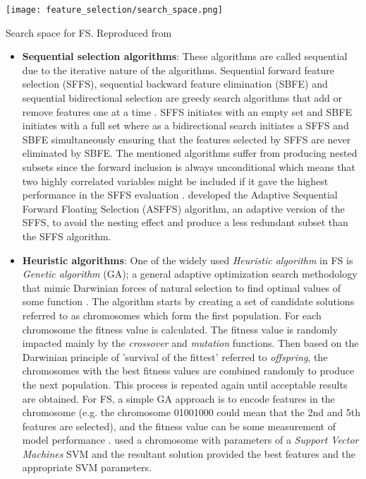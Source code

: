 \begin{marginfigure}
  \texttt{[image: feature\_selection/search\_space.png]}
  \caption{Search space for FS. Reproduced from \citet{liu2012feature}}
  \label{fig:fs_search_space}
\end{marginfigure}

\begin{itemize}
  \item\textbf{Sequential selection algorithms}: These algorithms are called sequential due to the iterative nature of the algorithms. Sequential forward feature selection (SFFS), sequential backward feature elimination (SBFE) and sequential bidirectional selection are greedy search algorithms that add or remove features one at a time \citep{liu2005toward}. SFFS initiates with an empty set and SBFE initiates with a full set where as a bidirectional search initiates a SFFS and SBFE simultaneously ensuring that the features selected by SFFS are never eliminated by SBFE. The mentioned algorithms suffer from producing nested subsets since the forward inclusion is always unconditional which means that two highly correlated variables might be included if it gave the highest performance in the SFFS evaluation \citep{chandrashekar2014survey}. \citet{sun2006comparison} developed the Adaptive Sequential Forward Floating Selection (ASFFS) algorithm, an adaptive version of the SFFS, to avoid the nesting effect and produce a less redundant subset than the SFFS algorithm.
  \item\textbf{Heuristic algorithms}: One of the widely used \textit{Heuristic algorithm} in FS is \textit{Genetic algorithm} (GA); a general adaptive optimization search methodology that mimic Darwinian forces of natural selection to find optimal values of some function \citep{chandrashekar2014survey}. The algorithm starts by creating a set of candidate solutions referred to as chromosomes which form the first population. For each chromosome the fitness value is calculated. The fitness value is randomly impacted mainly by the \textit{crossover} and \textit{mutation} functions. Then based on the Darwinian principle of 'survival of the fittest' referred to \textit{offspring}, the chromosomes with the best fitness values are combined randomly to produce the next population. This process is repeated again until acceptable results are obtained. For FS, a simple GA approach is to encode features in the chromosome (e.g. the chromosome 01001000 could mean that the 2nd and 5th features are selected), and the fitness value can be some measurement of model performance \citep{de2015grammar}. \citet{huang2006ga} used a chromosome with parameters of a \textit{Support Vector Machines} SVM and the resultant solution provided the best features and the appropriate SVM parameters.
\end{itemize}

